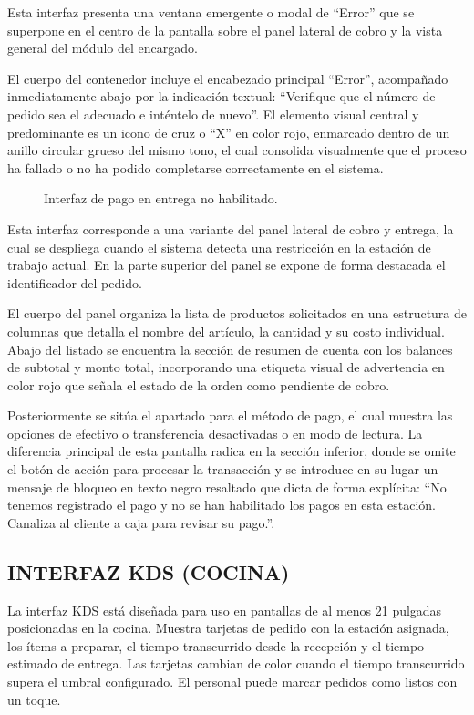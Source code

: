 Esta interfaz presenta una ventana emergente o modal de ``Error'' que se superpone en el centro de la pantalla sobre el panel lateral de cobro y la vista general del módulo del encargado. 

El cuerpo del contenedor incluye el encabezado principal ``Error'', acompañado inmediatamente abajo por la indicación textual: ``Verifique que el número de pedido sea el adecuado e inténtelo de nuevo''. El elemento visual central y predominante es un icono de cruz o ``X'' en color rojo, enmarcado dentro de un anillo circular grueso del mismo tono, el cual consolida visualmente que el proceso ha fallado o no ha podido completarse correctamente en el sistema.

\begin{figure}[H]
    \centering
    
    \caption{Interfaz de pago en entrega no habilitado.}
    \label{fig:ui-ent-04-a}
\end{figure}

Esta interfaz corresponde a una variante del panel lateral de cobro y entrega, la cual se despliega cuando el sistema detecta una restricción en la estación de trabajo actual. En la parte superior del panel se expone de forma destacada el identificador del pedido. 

El cuerpo del panel organiza la lista de productos solicitados en una estructura de columnas que detalla el nombre del artículo, la cantidad y su costo individual. Abajo del listado se encuentra la sección de resumen de cuenta con los balances de subtotal y monto total, incorporando una etiqueta visual de advertencia en color rojo que señala el estado de la orden como pendiente de cobro. 

Posteriormente se sitúa el apartado para el método de pago, el cual muestra las opciones de efectivo o transferencia desactivadas o en modo de lectura. La diferencia principal de esta pantalla radica en la sección inferior, donde se omite el botón de acción para procesar la transacción y se introduce en su lugar un mensaje de bloqueo en texto negro resaltado que dicta de forma explícita: ``No tenemos registrado el pago y no se han habilitado los pagos en esta estación. Canaliza al cliente a caja para revisar su pago.''.

\subsection{INTERFAZ KDS (COCINA)}
La interfaz KDS está diseñada para uso en pantallas de al menos 21 pulgadas posicionadas en la cocina. Muestra tarjetas de pedido con la estación asignada, los ítems a preparar, el tiempo transcurrido desde la recepción y el tiempo estimado de entrega. Las tarjetas cambian de color cuando el tiempo transcurrido supera el umbral configurado. El personal puede marcar pedidos como listos con un toque.

